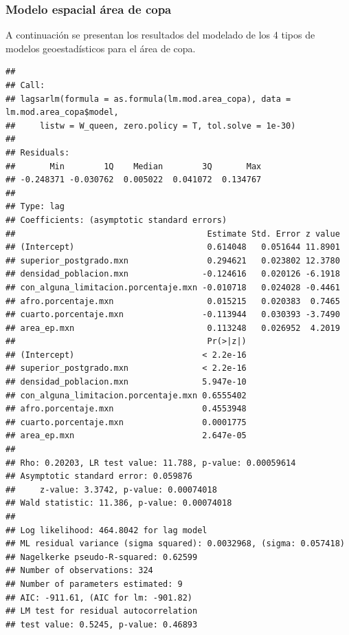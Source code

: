 \documentclass[12pt,]{book}
\newenvironment{Shaded}{\begin{snugshade}}{\end{snugshade}}
\newcommand{\KeywordTok}[1]{\textcolor[rgb]{0.13,0.29,0.53}{\textbf{#1}}}
\newcommand{\DataTypeTok}[1]{\textcolor[rgb]{0.13,0.29,0.53}{#1}}
\newcommand{\FloatTok}[1]{\textcolor[rgb]{0.00,0.00,0.81}{#1}}
\newcommand{\CommentTok}[1]{\textcolor[rgb]{0.56,0.35,0.01}{\textit{#1}}}
\newcommand{\OperatorTok}[1]{\textcolor[rgb]{0.81,0.36,0.00}{\textbf{#1}}}
\newcommand{\NormalTok}[1]{#1}
\begin{document}
\subsubsection{Modelo espacial área de
copa}\label{modelo-espacial-area-de-copa}

A continuación se presentan los resultados del modelado de los 4 tipos
de modelos geoestadísticos para el área de copa.

\begin{Shaded}
\end{Shaded}

\begin{verbatim}
## 
## Call:
## lagsarlm(formula = as.formula(lm.mod.area_copa), data = lm.mod.area_copa$model, 
##     listw = W_queen, zero.policy = T, tol.solve = 1e-30)
## 
## Residuals:
##       Min        1Q    Median        3Q       Max 
## -0.248371 -0.030762  0.005022  0.041072  0.134767 
## 
## Type: lag 
## Coefficients: (asymptotic standard errors) 
##                                       Estimate Std. Error z value
## (Intercept)                           0.614048   0.051644 11.8901
## superior_postgrado.mxn                0.294621   0.023802 12.3780
## densidad_poblacion.mxn               -0.124616   0.020126 -6.1918
## con_alguna_limitacion.porcentaje.mxn -0.010718   0.024028 -0.4461
## afro.porcentaje.mxn                   0.015215   0.020383  0.7465
## cuarto.porcentaje.mxn                -0.113944   0.030393 -3.7490
## area_ep.mxn                           0.113248   0.026952  4.2019
##                                       Pr(>|z|)
## (Intercept)                          < 2.2e-16
## superior_postgrado.mxn               < 2.2e-16
## densidad_poblacion.mxn               5.947e-10
## con_alguna_limitacion.porcentaje.mxn 0.6555402
## afro.porcentaje.mxn                  0.4553948
## cuarto.porcentaje.mxn                0.0001775
## area_ep.mxn                          2.647e-05
## 
## Rho: 0.20203, LR test value: 11.788, p-value: 0.00059614
## Asymptotic standard error: 0.059876
##     z-value: 3.3742, p-value: 0.00074018
## Wald statistic: 11.386, p-value: 0.00074018
## 
## Log likelihood: 464.8042 for lag model
## ML residual variance (sigma squared): 0.0032968, (sigma: 0.057418)
## Nagelkerke pseudo-R-squared: 0.62599 
## Number of observations: 324 
## Number of parameters estimated: 9 
## AIC: -911.61, (AIC for lm: -901.82)
## LM test for residual autocorrelation
## test value: 0.5245, p-value: 0.46893
\end{verbatim}
\end{document}
